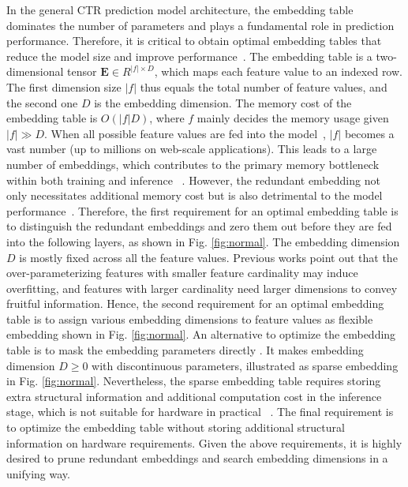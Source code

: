 \documentclass[sigconf]{acmart}
\begin{document}
In the general CTR prediction model architecture, the embedding table dominates the number of parameters and plays a fundamental role in prediction performance. Therefore, it is critical to obtain optimal embedding tables that reduce the model size and improve performance~\cite{MGQE,QR}. The embedding table is a two-dimensional tensor $\mathbf{E} \in R^{|f|\times D}$, which maps each feature value to an indexed row. The first dimension size $|f|$ thus equals the total number of feature values, and the second one $D$ is the embedding dimension. The memory cost of the embedding table is $O(|f|D)$, where $f$ mainly decides the memory usage given $|f| \gg D$. When all possible feature values are fed into the model~\cite{DeepFM,NFM}, $|f|$ becomes a vast number (up to millions on web-scale applications). This leads to a large number of embeddings, which contributes to the primary memory bottleneck within both training and inference ~\cite{sfctr}. However, the redundant embedding not only necessitates additional memory cost but is also detrimental to the model performance~\cite{autofield}. Therefore, the first requirement for an optimal embedding table is to distinguish the redundant embeddings and zero them out before they are fed into the following layers, as shown in Fig. \ref{fig:normal}.
The embedding dimension $D$ is mostly fixed across all the feature values. Previous works\cite{MGQE,AutoDim} point out that the over-parameterizing features with smaller feature cardinality may induce overfitting, and features with larger cardinality need larger dimensions to convey fruitful information. Hence, the second requirement for an optimal embedding table is to assign various embedding dimensions to feature values as flexible embedding shown in Fig. \ref{fig:normal}.
An alternative to optimize the embedding table is to mask the embedding parameters directly \cite{single-shot, PEP}. It makes embedding dimension $D \geq 0$ with discontinuous parameters, illustrated as sparse embedding in Fig. \ref{fig:normal}. Nevertheless, the sparse embedding table requires storing extra structural information and additional computation cost in the inference stage, which is not suitable for hardware in practical ~\cite{deeplight}.
The final requirement is to optimize the embedding table without storing additional structural information on hardware requirements. 
Given the above requirements, it is highly desired to prune redundant embeddings and search embedding dimensions in a unifying way.
\end{document}
